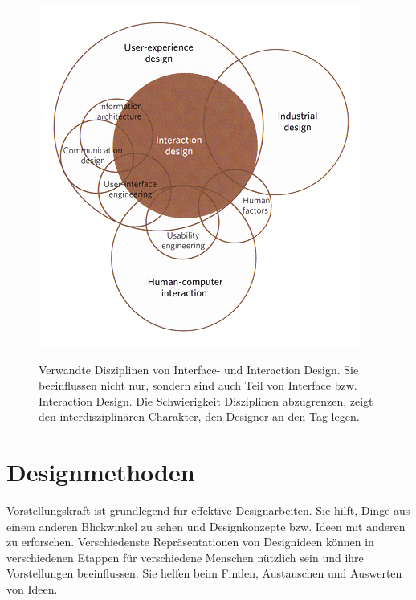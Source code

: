 \begin{figure}
	\begin{center}
        {\includegraphics[width=1\linewidth]{gfx/safferInteractionDisciplines}}
	\end{center}
		\caption[Verwandte Disziplinen von Interface- und Interaction Design \newline \citep{Saffer:2007}]{Verwandte Disziplinen von Interface- und Interaction Design. Sie beeinflussen nicht nur, sondern sind auch Teil von Interface bzw. Interaction Design. Die Schwierigkeit	Disziplinen abzugrenzen, zeigt den interdisziplinären Charakter, den Designer an den Tag legen.}\label{fig:safferInteractionDisciplines}
\end{figure}
\clearpage

\section{Designmethoden} \label{sec:designmethoden} 
Vorstellungskraft ist grundlegend für effektive Designarbeiten. Sie hilft, Dinge aus einem anderen Blickwinkel zu sehen und Designkonzepte bzw. Ideen mit anderen zu erforschen. Verschiedenste Repräsentationen von Designideen können in verschiedenen Etappen für verschiedene Menschen nützlich sein und ihre Vorstellungen beeinflussen. Sie helfen beim Finden, Austauschen und Auswerten von Ideen.

